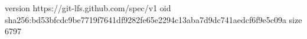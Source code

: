 version https://git-lfs.github.com/spec/v1
oid sha256:bd53bfcdc9be7719f7641df9282fe65e2294c13aba7d9dc741aedcf6f9e5c09a
size 6797
